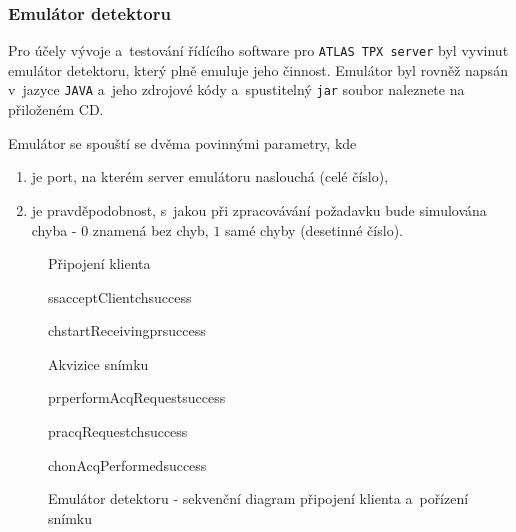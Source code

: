 \subsubsection{Emulátor detektoru}\label{atlas:cont:emulator}
Pro účely vývoje a~testování řídícího software pro \texttt{ATLAS TPX server} byl vyvinut emulátor detektoru, který plně emuluje jeho činnost. Emulátor byl rovněž napsán v~jazyce \texttt{JAVA} a~jeho zdrojové kódy a~spustitelný \texttt{jar} soubor naleznete na přiloženém CD.

Emulátor se spouští se dvěma povinnými parametry, kde
\begin{enumerate}
	\item je port, na kterém server emulátoru naslouchá (celé číslo),
	\item je pravděpodobnost, s~jakou při zpracovávání požadavku bude simulována chyba - $0$ znamená bez chyb, $1$ samé chyby (desetinné číslo).
\end{enumerate}

\begin{figure}[t]
	\begin{center}
		\begin{sequencediagram}
			\begin{sdblock}{Připojení klienta}{}
				\begin{call}{ss}{acceptClient}{ch}{success}
					\begin{call}{ch}{startReceiving}{pr}{success}
					\end{call}
				\end{call}
			\end{sdblock}
			\begin{sdblock}{Akvizice snímku}{}
				\begin{callself}{pr}{performAcqRequest}{success}
					\begin{call}{pr}{acqRequest}{ch}{success}
					\end{call}	
				\end{callself}	
				\postlevel
				\begin{callself}{ch}{onAcqPerformed}{success}
				\end{callself}	
			\end{sdblock}			
		\end{sequencediagram}
		\caption{Emulátor detektoru - sekvenční diagram připojení klienta a~pořízení snímku}
		\label{fig:uml:emulator}
	\end{center}
\end{figure}

